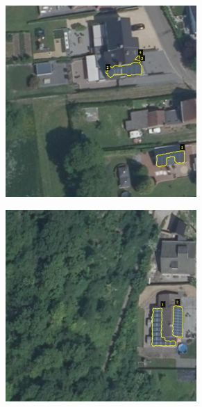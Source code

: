 \documentclass[a4paper, 12pt]{article}
\begin{document}
\begin{figure}[H]
    \centering
    \begin{subfigure}{0.49\textwidth}
        \centering
        \includegraphics[width=0.8\textwidth]{resources/jpg/609089_533186.jpg}
        \vspace{0.5em}
    \end{subfigure}
    \begin{subfigure}{0.49\textwidth}
        \centering
        \includegraphics[width=0.8\textwidth]{resources/jpg/609089_533204.jpg}
        \vspace{0.5em}
    \end{subfigure}

\end{figure}
\end{document}
